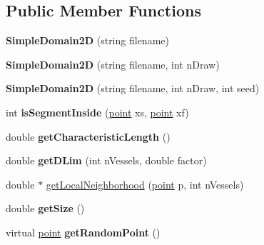 \subsection*{Public Member Functions}
\begin{DoxyCompactItemize}
\item 
\mbox{\label{class_simple_domain2_d_ab3dbf074d26b0c2eff95b1193fd391d6}} 
{\bfseries Simple\+Domain2D} (string filename)
\item 
\mbox{\label{class_simple_domain2_d_a7ca5e6511dc12cc39374d75a8170267a}} 
{\bfseries Simple\+Domain2D} (string filename, int n\+Draw)
\item 
\mbox{\label{class_simple_domain2_d_a4c1bd4f8795cab0aaa3a8290f841c1d2}} 
{\bfseries Simple\+Domain2D} (string filename, int n\+Draw, int seed)
\item 
\mbox{\label{class_simple_domain2_d_a18706cdbe4f61a71eceb7257fd4ec6dd}} 
int {\bfseries is\+Segment\+Inside} (\mbox{\hyperlink{structpoint}{point}} xs, \mbox{\hyperlink{structpoint}{point}} xf)
\item 
\mbox{\label{class_simple_domain2_d_a5bf4df64fe80dae1e394b2f2c73c3d05}} 
double {\bfseries get\+Characteristic\+Length} ()
\item 
\mbox{\label{class_simple_domain2_d_a8541d458432cb0952245e1b09310043c}} 
double {\bfseries get\+D\+Lim} (int n\+Vessels, double factor)
\item 
double $\ast$ \mbox{\hyperlink{class_simple_domain2_d_a63d4331fa6256143607785bef3c83edf}{get\+Local\+Neighborhood}} (\mbox{\hyperlink{structpoint}{point}} p, int n\+Vessels)
\item 
\mbox{\label{class_simple_domain2_d_ad5e1ba1529fd8088f64af603cc5c18a3}} 
double {\bfseries get\+Size} ()
\item 
\mbox{\label{class_simple_domain2_d_a8b19e2fa69a0f13813b0296f270f11e9}} 
virtual \mbox{\hyperlink{structpoint}{point}} {\bfseries get\+Random\+Point} ()
\item 
\mbox{\label{class_simple_domain2_d_acd933370c22531a7aaabaadc7e4419f7}} 

\end{DoxyCompactItemize}
